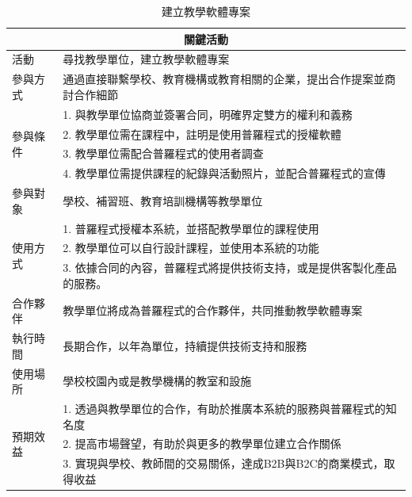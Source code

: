 \begin{table}[H]
  \centering
  \caption{建立教學軟體專案}
  \begin{tabular}{|l|l|}
      \hline
      \multicolumn{2}{|c|}{\textbf{關鍵活動}} \\ \hline
      活動 & 尋找教學單位，建立教學軟體專案 \\ \hline
      參與方式 & 通過直接聯繫學校、教育機構或教育相關的企業，提出合作提案並商討合作細節 \\ \hline
      \multirow{4}{*}{參與條件} 
      & 1. 與教學單位協商並簽署合同，明確界定雙方的權利和義務 \\ 
      & 2. 教學單位需在課程中，註明是使用普羅程式的授權軟體 \\ 
      & 3. 教學單位需配合普羅程式的使用者調查 \\ 
      & 4. 教學單位需提供課程的紀錄與活動照片，並配合普羅程式的宣傳 \\ \hline
      參與對象 & 學校、補習班、教育培訓機構等教學單位 \\ \hline
      \multirow{3}{*}{使用方式} 
      & 1. 普羅程式授權本系統，並搭配教學單位的課程使用 \\
      & 2. 教學單位可以自行設計課程，並使用本系統的功能 \\
      & 3. 依據合同的內容，普羅程式將提供技術支持，或是提供客製化產品的服務。\\ \hline
      合作夥伴 & 教學單位將成為普羅程式的合作夥伴，共同推動教學軟體專案  \\ \hline
      執行時間 & 長期合作，以年為單位，持續提供技術支持和服務  \\ \hline
      使用場所 & 學校校園內或是教學機構的教室和設施 \\ \hline
      \multirow{3}{*}{預期效益}
      & 1. 透過與教學單位的合作，有助於推廣本系統的服務與普羅程式的知名度 \\
      & 2. 提高市場聲望，有助於與更多的教學單位建立合作關係 \\
      & 3. 實現與學校、教師間的交易關係，達成B2B與B2C的商業模式，取得收益 \\ \hline
  \end{tabular}
\end{table}


  
